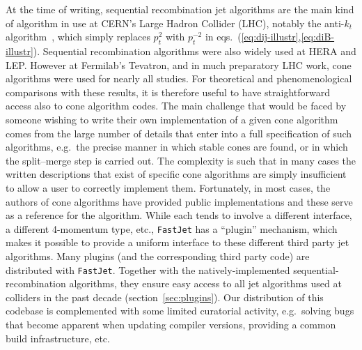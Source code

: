 \documentclass[12pt,a4]{article}
\newcommand{\fastjet}{\texttt{FastJet}\xspace}
\begin{document}
At the time of writing, sequential recombination jet algorithms are
the main kind of algorithm in use at CERN's Large Hadron Collider
(LHC), notably the anti-$k_t$ algorithm~\cite{antikt}, which simply
replaces $p_{t}^2$ with $p_{t}^{-2}$ in
eqs.~(\ref{eq:dij-illustr},\ref{eq:diB-illustr}). Sequential
recombination algorithms were also widely used at HERA and LEP.
%
However at Fermilab's Tevatron, and in much preparatory LHC work, cone
algorithms were used for nearly all studies.
%
For theoretical and phenomenological comparisons with these results,
it is therefore useful to have straightforward access also to cone
algorithm codes.
%
The main challenge that would be faced by someone wishing to write
their own implementation of a given cone algorithm comes from the
large number of details that enter into a full specification of such
algorithms, e.g.\ the precise manner in which stable cones are found,
or in which the split--merge step is carried out.
%
The complexity is such that in many cases the written descriptions
that exist of specific cone algorithms are simply insufficient to
allow a user to correctly implement them.
%
Fortunately, in most cases, the authors of cone algorithms have
provided public implementations and these serve as a reference for the
algorithm.
%
While each tends to involve a different interface, a different
4-momentum type, etc.,
%
\fastjet has a ``plugin'' mechanism, which makes it possible
to provide a uniform interface to these different third party jet
algorithms.
%
Many plugins (and the corresponding third party code) are distributed
with \fastjet. 
%
Together with the natively-implemented sequential-recombination
algorithms, they ensure easy access to all jet algorithms used at
colliders in the past decade (section~\ref{sec:plugins}).
%
Our distribution of this codebase is complemented with some limited
curatorial activity, e.g.\ solving bugs that become apparent when
updating compiler versions, providing a common build infrastructure,
etc.
%
\end{document}
